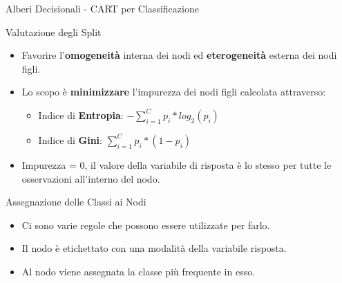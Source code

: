 \documentclass[9pt, xcolor=table]{beamer}
\begin{document}
	\begin{frame}{Alberi Decisionali - CART per Classificazione}
		\begin{block}{Valutazione degli Split}
			\begin{itemize}
				\item Favorire l'\textbf{omogeneità} interna dei nodi ed \textbf{eterogeneità} esterna dei nodi figli.
				
				\item Lo scopo è \textbf{minimizzare} l'impurezza dei nodi figli calcolata attraverso:
				\begin{itemize}
					\item Indice di \textbf{Entropia}: $-\sum_{i=1}^{C} p_i*log_2(p_i)$				
					\item Indice di \textbf{Gini}: $\sum_{i=1}^{C} p_i*(1-p_i)$
				\end{itemize}
			    \item Impurezza = 0, il valore della variabile di risposta è lo stesso per tutte le osservazioni all'interno del nodo.
			\end{itemize}
		\end{block}
	
		\begin{block}{Assegnazione delle Classi ai Nodi}
			\begin{itemize}
				\item Ci sono varie regole che possono essere utilizzate per farlo.
				\item Il nodo è etichettato con una modalità della variabile risposta.		
				\item Al nodo viene assegnata la classe più frequente in esso.
			\end{itemize}
		\end{block}
	\end{frame}
\end{document}
